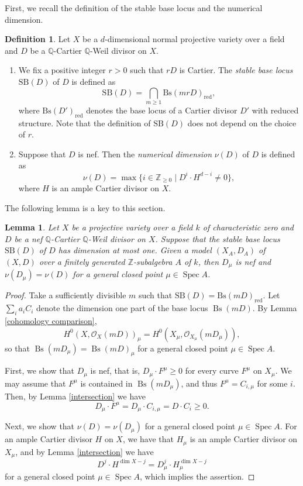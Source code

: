 \documentclass[12pt]{amsart}
\def\ge{\geqslant}
\def\Spec{\operatorname{Spec}}
\def\max{\operatorname{max}}
\def\Bs{\operatorname{Bs}}
\newcommand{\Q}{\mathbb{Q}}
\newcommand{\Z}{\mathbb{Z}}
\newcommand{\sO}{\mathcal{O}}
\theoremstyle{plain}
\newtheorem{lem}[thm]{Lemma}
\theoremstyle{definition}
\newtheorem{defn}[thm]{Definition}
\theoremstyle{remark}
\newtheorem{defn and notation}[thm]{Definition and Notation}
\theoremstyle{plain}
\begin{document}
First, we recall the definition of the stable base locus and the numerical dimension. 
\begin{defn}
Let $X$ be a $d$-dimensional normal projective variety over a field and $D$ be a $\Q$-Cartier $\Q$-Weil divisor on $X$.
\begin{enumerate}
\item 
We fix a positive integer $r>0$ such that $rD$ is Cartier.
The \textit{stable base locus} $\mathrm{SB}(D)$ of $D$ is defined as
\[
\mathrm{SB}(D)= \bigcap_{m\geq 1}\mathrm{Bs}(mrD)_{\mathrm{red}},
\]
where $\mathrm{Bs}(D')_{\mathrm{red}}$ denotes the base locus of a Cartier divisor $D'$ with reduced structure.
Note that the definition of $\mathrm{SB}(D)$ does not depend on the choice of $r$.
\item 
Suppose that $D$ is nef. Then the \textit{numerical dimension} $\nu(D)$ of $D$ is defined as 
\[
\nu(D)=\max\{i \in \Z_{\ge 0} \; | \; D^{i} \cdot H^{d-i} \ne 0\},
\]
where $H$ is an ample Cartier divisor on $X$. 
\end{enumerate}
\end{defn}

The following lemma is a key to this section. 

\begin{lem}\label{lem:nef reduction}
Let $X$ be a projective variety over a field $k$ of characteristic zero and $D$ be a nef $\Q$-Cartier $\Q$-Weil divisor on $X$.
Suppose that the stable base locus $\mathrm{SB}(D)$ of $D$ has dimension at most one. 
Given a model $(X_A, D_A)$ of $(X, D)$ over a finitely generated $\Z$-subalgebra $A$ of $k$, 
then $D_{\mu}$ is nef and $\nu(D_{\mu})=\nu(D)$ for a general closed point $\mu \in \Spec A$. 
\end{lem}
\begin{proof}
Take a sufficiently divisible $m$ such that $\mathrm{SB}(D)=\mathrm{Bs}(mD)_{\mathrm{red}}$. 
Let $\sum_{i}a_iC_i$ denote the dimension one part of the base locus $\Bs(mD)$.
By Lemma \ref{cohomology comparison}, 
\[H^0(X, \sO_X(mD))_{\mu} = H^0(X_{\mu}, \sO_{X_{\mu}}(mD_{\mu})),\]
so that $\Bs(mD_{\mu})= \Bs(mD)_{\mu}$ for a general closed point $\mu \in \Spec A$. 

First, we  show that $D_{\mu}$ is nef, that is, $D_{\mu}\cdot F^{\mu}\geq 0$ for every curve $F^{\mu}$ on $X_{\mu}$. 
We may assume that $F^{\mu}$ is contained in $\Bs(mD_{\mu})$, and thus $F^{\mu}=C_{i,\mu}$ for some $i$.
Then, by Lemma \ref{intersection} we have 
\[
D_{\mu}\cdot F^{\mu}=D_{\mu}\cdot C_{i,\mu}= D\cdot C_{i}\geq 0.
\] 

Next, we  show that $\nu(D)=\nu(D_{\mu})$ for a general closed point $\mu \in \Spec A$. 
For an ample Cartier divisor $H$ on $X$, we have  that $H_{\mu}$ is an ample Cartier divisor on $X_{\mu}$, and by Lemma \ref{intersection} we have 
\[
D^{j}\cdot H^{\dim X-j}=D_{\mu}^{j}\cdot H_{\mu}^{\dim X-j} 
\] 
for a general closed point $\mu \in \Spec A$, which implies the assertion. 
\end{proof}
\end{document}
